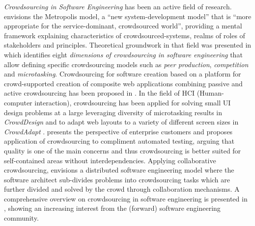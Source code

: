 \emph{Crowdsourcing in Software Engineering} has been an active field of research.
\autocite{Kazman2009} envisions the Metropolis model, a ``new system-development model'' that is ``more appropriate for the service-dominant, crowdsourced world'', providing a mental framework explaining characteristics of crowdsourced-systems, realms of roles of stakeholders and principles.
Theoretical groundwork in that field was presented in \autocite{Latoza2016} which identifies eight \emph{dimensions of crowdsourcing in software engineering} that allow defining specific crowdsourcing models such as \emph{peer production}, \emph{competition} and \emph{microtasking}.
Crowdsourcing for software creation based on a platform for crowd-supported creation of composite web applications combining passive and active crowdsourcing has been proposed in \autocite{Nebeling2012}.
In the field of HCI (Human-computer interaction), crowdsourcing has been applied for solving small UI design problems at a large leveraging diversity of microtasking results in \emph{CrowdDesign} \autocite{Weidema2016CrowdDesign} and to adapt web layouts to a variety of different screen sizes in \emph{CrowdAdapt} \autocite{Nebeling2013CrowdAdapt}.
\autocite{Stol2014} presents the perspective of enterprise customers and proposes application of crowdsourcing to compliment automated testing, arguing that quality is one of the main concerns and thus crowdsourcing is better suited for self-contained areas without interdependencies.
Applying collaborative crowdsourcing, \autocite{Satzger2014} envisions a distributed software engineering model where the software architect sub-divides problems into crowdsourcing tasks which are further divided and solved by the crowd through collaboration mechanisms.
A comprehensive overview on crowdsourcing in software engineering is presented in \autocite{Mao2017}, showing an increasing interest from the (forward) software engineering community.

